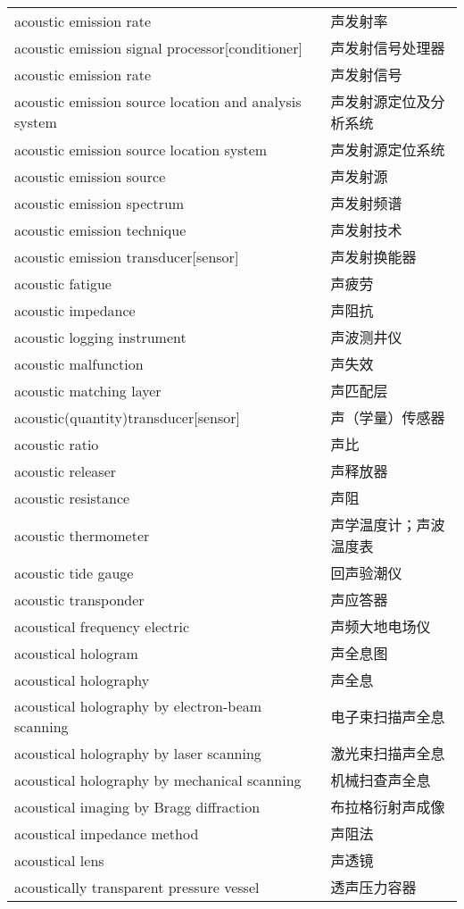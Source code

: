 \documentclass[
]{article}
\begin{document}
\begin{longtable}[]{@{}ll@{}}
acoustic emission rate & 声发射率 \\
acoustic emission signal processor{[}conditioner{]} &
声发射信号处理器 \\
acoustic emission rate & 声发射信号 \\
acoustic emission source location and analysis system &
声发射源定位及分析系统 \\
acoustic emission source location system & 声发射源定位系统 \\
acoustic emission source & 声发射源 \\
acoustic emission spectrum & 声发射频谱 \\
acoustic emission technique & 声发射技术 \\
acoustic emission transducer{[}sensor{]} & 声发射换能器 \\
acoustic fatigue & 声疲劳 \\
acoustic impedance & 声阻抗 \\
acoustic logging instrument & 声波测井仪 \\
acoustic malfunction & 声失效 \\
acoustic matching layer & 声匹配层 \\
acoustic(quantity)transducer{[}sensor{]} & 声（学量）传感器 \\
acoustic ratio & 声比 \\
acoustic releaser & 声释放器 \\
acoustic resistance & 声阻 \\
acoustic thermometer & 声学温度计；声波温度表 \\
acoustic tide gauge & 回声验潮仪 \\
acoustic transponder & 声应答器 \\
acoustical frequency electric & 声频大地电场仪 \\
acoustical hologram & 声全息图 \\
acoustical holography & 声全息 \\
acoustical holography by electron-beam scanning & 电子束扫描声全息 \\
acoustical holography by laser scanning & 激光束扫描声全息 \\
acoustical holography by mechanical scanning & 机械扫查声全息 \\
acoustical imaging by Bragg diffraction & 布拉格衍射声成像 \\
acoustical impedance method & 声阻法 \\
acoustical lens & 声透镜 \\
acoustically transparent pressure vessel & 透声压力容器 \\

\end{longtable}
\end{document}
